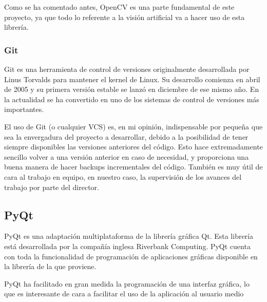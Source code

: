 Como se ha comentado antes, OpenCV es una parte fundamental de este proyecto, ya que todo lo referente a la visión artificial va a hacer uso de esta librería.

\subsubsection*{Git}
Git es una herramienta de control de versiones originalmente desarrollada por Linus Torvalds para mantener el kernel de Linux. Su desarrollo comienza en abril de 2005 y su primera versión estable se lanzó en diciembre de ese mismo año. En la actualidad se ha convertido en uno de los sistemas de control de versiones más importantes.

El uso de Git (o cualquier VCS) es, en mi opinión, indispensable por pequeña que sea la envergadura del proyecto a desarrollar, debido a la posibilidad de tener siempre disponibles las versiones anteriores del código. Esto hace extremadamente sencillo volver a una versión anterior en caso de necesidad, y proporciona una buena manera de hacer backups incrementales del código. También es muy útil de cara al trabajo en equipo, en nuestro caso, la supervisión de los avances del trabajo por parte del director.

\subsection*{PyQt}
PyQt es una adaptación multiplataforma de la librería gráfica Qt. Esta librería está desarrollada por la compañía inglesa Riverbank Computing. PyQt cuenta con toda la funcionalidad de programación de aplicaciones gráficas disponible en la librería de la que proviene.

PyQt ha facilitado en gran medida la programación de una interfaz gráfica, lo que es interesante de cara a facilitar el uso de la aplicación al usuario medio